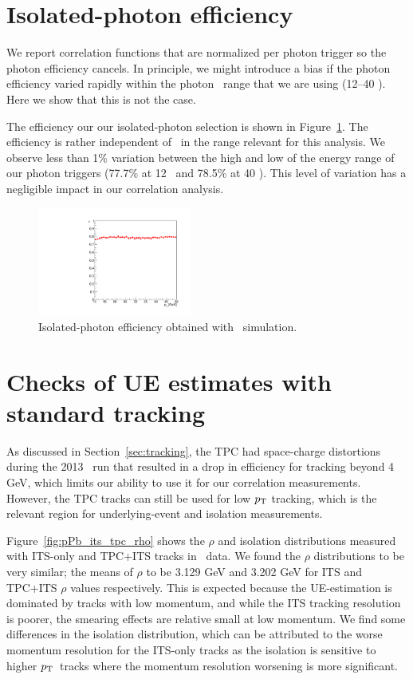 \label{sec:EfficiencyAppendix}
\section{Isolated-photon efficiency}

We report correlation functions that are normalized per photon trigger so the photon efficiency cancels. In principle, we might introduce a bias if the photon efficiency varied rapidly within the photon \pt~range that we are using (12--40 \GeVc). Here we show that this is not the case.  

The efficiency our our isolated-photon selection is shown in Figure~\ref{fig:photonEff_pPb}. The efficiency is rather independent of \pt~in the range relevant for this analysis. We observe less than 1\% variation between the high and low of the energy range of our photon triggers (77.7\% at 12 \GeVc~and 78.5\% at 40 \GeVc). This level of variation has a negligible impact in our correlation analysis. 
\begin{figure}
\centering
\includegraphics[width=0.45\textwidth]{EfficiencyAppendix/Efficiency_photon_pPb.pdf}
\caption{Isolated-photon efficiency obtained with \pPb~simulation.}
\label{fig:photonEff_pPb}
\end{figure}

\section{Checks of UE estimates with standard tracking }
As discussed in Section~\ref{sec:tracking}, the TPC had space-charge distortions during the 2013 \pPb~run that resulted in a drop in efficiency for tracking beyond 4 GeV, which limits our ability to use it for our correlation measurements. However, the TPC tracks can still be used for low $p_{\mathrm{T}}$ tracking, which is the relevant region for underlying-event and isolation measurements. 

Figure~\ref{fig:pPb_its_tpc_rho} shows the $\rho$  and isolation distributions measured with ITS-only and TPC+ITS tracks in \pPb~data. We found the $\rho$ distributions to be very similar; the means of $\rho$ to be 3.129 GeV and 3.202 GeV for ITS and TPC+ITS $\rho$ values respectively. This is expected because the UE-estimation is dominated by tracks with low momentum, and while the ITS tracking resolution is poorer, the smearing effects are relative small at low momentum. We find some differences in the isolation distribution, which can be attributed to the worse momentum resolution for the ITS-only tracks as the isolation is sensitive to higher $p_{\mathrm{T}}$~tracks where the momentum resolution worsening is more significant. 


